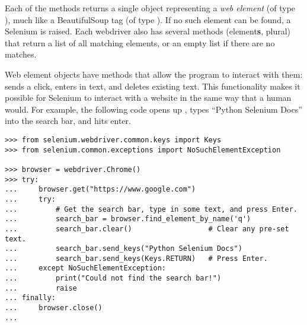 Each of the  methods returns a single object representing a \emph{web element} (of type ), much like a BeautifulSoup tag (of type ).
If no such element can be found, a Selenium  is raised.
Each webdriver also has several  methods (element\textbf{s}, plural) that return a list of all matching elements, or an empty list if there are no matches.

Web element objects have methods that allow the program to interact with them:  sends a click,  enters in text, and  deletes existing text.
This functionality makes it possible for Selenium to interact with a website in the same way that a human would.
For example, the following code opens up , types ``Python Selenium Docs'' into the search bar, and hits enter.

\begin{lstlisting}
>>> from selenium.webdriver.common.keys import Keys
>>> from selenium.common.exceptions import NoSuchElementException

>>> browser = webdriver.Chrome()
>>> try:
...     browser.get("https://www.google.com")
...     try:
...         # Get the search bar, type in some text, and press Enter.
...         search_bar = browser.find_element_by_name('q')
...         search_bar.clear()                  # Clear any pre-set text.
...         search_bar.send_keys("Python Selenium Docs")
...         search_bar.send_keys(Keys.RETURN)   # Press Enter.
...     except NoSuchElementException:
...         print("Could not find the search bar!")
...         raise
... finally:
...     browser.close()
...
\end{lstlisting}


\begin{comment} %
To illustrate that using Selenium solves the problem of asynchronously-loaded content, use it to load the soccer statistics page from the previous example.
\begin{lstlisting}
>>> browser = webdriver.Chrome()
>>> soccer_url = "http://www.simplesoccerstats.com/stats/teamstats.php?lge=14&type=goals&season=0"
>>> browser.get(soccer_url)
>>> soccer_soup = BeautifulSoup(browser.page_source)
>>> browser.quit() # Closes the web browser.
>>> print(soccer_soup.find(string='Chicago').parent)
<<<td>Chicago</td>>>
\end{lstlisting}
Notice that there is now a tag containing \li{"Chicago"}.
\end{comment}

